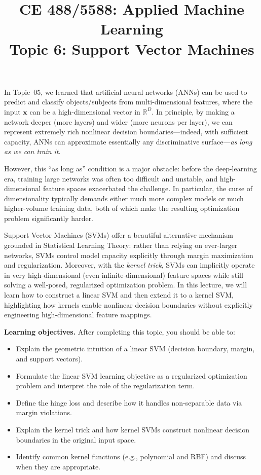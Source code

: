 \documentclass[12pt]{article}
\begin{document}
\doublespacing	
\title{CE 488/5588: Applied Machine Learning\\ \large Topic 6: Support Vector Machines}
\author{}
\date{}
\maketitle


In Topic~05, we learned that artificial neural networks (ANNs) can be used to predict and classify objects/subjects from multi-dimensional features, where the input $\bm{x}$ can be a high-dimensional vector in $\mathbb{R}^D$. In principle, by making a network deeper (more layers) and wider (more neurons per layer), we can represent extremely rich nonlinear decision boundaries---indeed, with sufficient capacity, ANNs can approximate essentially any discriminative surface---\emph{as long as we can train it}.

However, this ``as long as'' condition is a major obstacle: before the deep-learning era, training large networks was often too difficult and unstable, and high-dimensional feature spaces exacerbated the challenge. In particular, the curse of dimensionality typically demands either much more complex models or much higher-volume training data, both of which make the resulting optimization problem significantly harder.

Support Vector Machines (SVMs) offer a beautiful alternative mechanism grounded in Statistical Learning Theory: rather than relying on ever-larger networks, SVMs control model capacity explicitly through margin maximization and regularization. Moreover, with the \emph{kernel trick}, SVMs can implicitly operate in very high-dimensional (even infinite-dimensional) feature spaces while still solving a well-posed, regularized optimization problem. In this lecture, we will learn how to construct a linear SVM and then extend it to a kernel SVM, highlighting how kernels enable nonlinear decision boundaries without explicitly engineering high-dimensional feature mappings.

\noindent\textbf{Learning objectives.} After completing this topic, you should be able to:
\begin{itemize}
    \item Explain the geometric intuition of a linear SVM (decision boundary, margin, and support vectors).
    \item Formulate the linear SVM learning objective as a regularized optimization problem and interpret the role of the regularization term.
    \item Define the hinge loss and describe how it handles non-separable data via margin violations.
    \item Explain the kernel trick and how kernel SVMs construct nonlinear decision boundaries in the original input space.
    \item Identify common kernel functions (e.g., polynomial and RBF) and discuss when they are appropriate.
\end{itemize}
\end{document}
